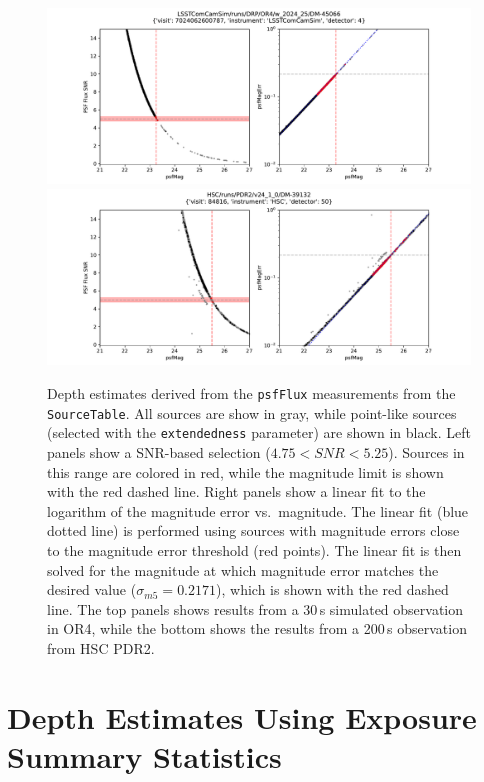 \documentclass[DM,authoryear,toc]{lsstdoc}
\begin{document}
\begin{figure}[t]
    \includegraphics[width=\textwidth]{figures/or4_maglim_catalog.pdf}
    \includegraphics[width=\textwidth]{figures/hsc_pdr2_maglim_catalog.pdf}
    \caption{\label{fig:catalog} Depth estimates derived from the \texttt{psfFlux} measurements from the \texttt{SourceTable}. All sources are show in gray, while point-like sources (selected with the \texttt{extendedness} parameter) are shown in black. 
    Left panels show a SNR-based selection ($4.75 < SNR < 5.25$). Sources in this range are colored in red, while the magnitude limit is shown with the red dashed line.
    Right panels show a linear fit to the logarithm of the magnitude error vs.\ magnitude. The linear fit (blue dotted line) is performed using sources with magnitude errors close to the magnitude error threshold (red points). The linear fit is then solved for the magnitude at which magnitude error matches the desired value ($\sigma_{m5} = 0.2171$), which is shown with the red dashed line. The top panels shows results from a 30\,s simulated observation in OR4, while the bottom shows the results from a 200\,s observation from HSC PDR2.}
\end{figure}

\section{Depth Estimates Using Exposure Summary Statistics}
\end{document}
